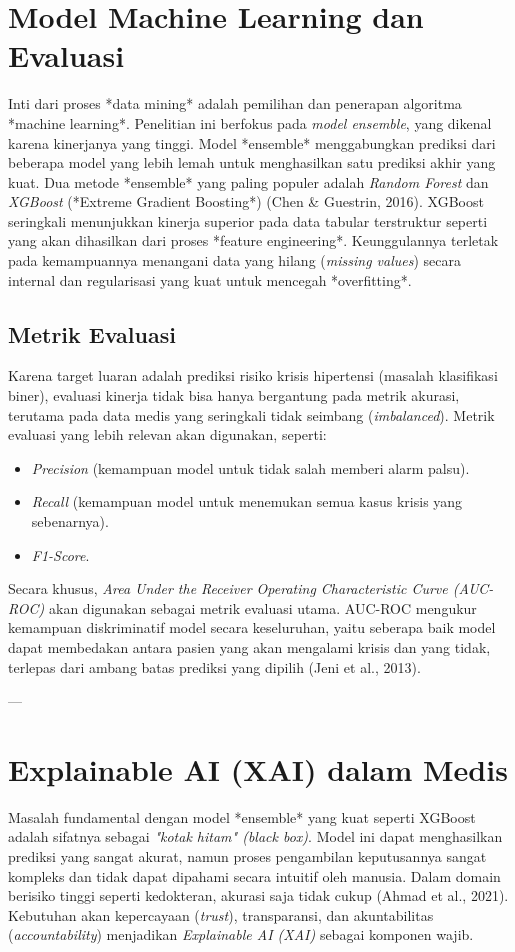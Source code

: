 \section{Model Machine Learning dan Evaluasi}
Inti dari proses *data mining* adalah pemilihan dan penerapan algoritma *machine learning*. Penelitian ini berfokus pada \textit{model ensemble}, yang dikenal karena kinerjanya yang tinggi. Model *ensemble* menggabungkan prediksi dari beberapa model yang lebih lemah untuk menghasilkan satu prediksi akhir yang kuat. Dua metode *ensemble* yang paling populer adalah \textit{Random Forest} dan \textit{XGBoost} (*Extreme Gradient Boosting*) (Chen \& Guestrin, 2016). XGBoost seringkali menunjukkan kinerja superior pada data tabular terstruktur seperti yang akan dihasilkan dari proses *feature engineering*. Keunggulannya terletak pada kemampuannya menangani data yang hilang (\textit{missing values}) secara internal dan regularisasi yang kuat untuk mencegah *overfitting*.

\subsection{Metrik Evaluasi}
Karena target luaran adalah prediksi risiko krisis hipertensi (masalah klasifikasi biner), evaluasi kinerja tidak bisa hanya bergantung pada metrik akurasi, terutama pada data medis yang seringkali tidak seimbang (\textit{imbalanced}). Metrik evaluasi yang lebih relevan akan digunakan, seperti:
\begin{itemize}
    \item \textit{Precision} (kemampuan model untuk tidak salah memberi alarm palsu).
    \item \textit{Recall} (kemampuan model untuk menemukan semua kasus krisis yang sebenarnya).
    \item \textit{F1-Score}.
\end{itemize}
Secara khusus, \textit{Area Under the Receiver Operating Characteristic Curve (AUC-ROC)} akan digunakan sebagai metrik evaluasi utama. AUC-ROC mengukur kemampuan diskriminatif model secara keseluruhan, yaitu seberapa baik model dapat membedakan antara pasien yang akan mengalami krisis dan yang tidak, terlepas dari ambang batas prediksi yang dipilih (Jeni et al., 2013).

--- %
\section{Explainable AI (XAI) dalam Medis}
Masalah fundamental dengan model *ensemble* yang kuat seperti XGBoost adalah sifatnya sebagai \textit{"kotak hitam" (black box)}. Model ini dapat menghasilkan prediksi yang sangat akurat, namun proses pengambilan keputusannya sangat kompleks dan tidak dapat dipahami secara intuitif oleh manusia. Dalam domain berisiko tinggi seperti kedokteran, akurasi saja tidak cukup (Ahmad et al., 2021). Kebutuhan akan kepercayaan (\textit{trust}), transparansi, dan akuntabilitas (\textit{accountability}) menjadikan \textit{Explainable AI (XAI)} sebagai komponen wajib.

